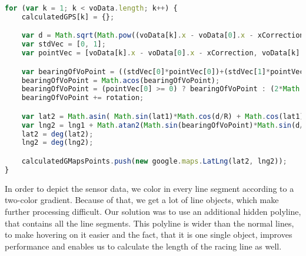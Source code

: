 \begin{lstlisting}[language=JavaScript]
for (var k = 1; k < voData.length; k++) {
	calculatedGPS[k] = {};

	var d = Math.sqrt(Math.pow((voData[k].x - voData[0].x - xCorrection), 2) + Math.pow((voData[k].y - voData[0].y - yCorrection), 2)) * voScaleFactor / 1000;
	var stdVec = [0, 1];
	var pointVec = [voData[k].x - voData[0].x - xCorrection, voData[k].y - voData[0].y - yCorrection];

	var bearingOfVoPoint = ((stdVec[0]*pointVec[0])+(stdVec[1]*pointVec[1]))/(Math.sqrt(Math.pow(stdVec[0], 2)+Math.pow(stdVec[1], 2))*Math.sqrt(Math.pow(pointVec[0], 2)+Math.pow(pointVec[1], 2)));
	bearingOfVoPoint = Math.acos(bearingOfVoPoint);
	bearingOfVoPoint = (pointVec[0] >= 0) ? bearingOfVoPoint : (2*Math.PI)-bearingOfVoPoint;
	bearingOfVoPoint += rotation;

	var lat2 = Math.asin( Math.sin(lat1)*Math.cos(d/R) + Math.cos(lat1)*Math.sin(d/R)*Math.cos(bearingOfVoPoint) );
	var lng2 = lng1 + Math.atan2(Math.sin(bearingOfVoPoint)*Math.sin(d/R)*Math.cos(lat1), Math.cos(d/R)-Math.sin(lat1)*Math.sin(lat2));
	lat2 = deg(lat2);
	lng2 = deg(lng2);

	calculatedGMapsPoints.push(new google.maps.LatLng(lat2, lng2));
}
\end{lstlisting}
\clearpage
In order to depict the sensor data, we color in every line segment according to a two-color gradient. Because of that, we get a lot of line objects, which make further processing difficult. Our solution was to use an additional hidden polyline, that contains all the line segments. This polyline is wider than the normal lines, to make hovering on it easier and the fact, that it is one single object, improves performance and enables us to calculate the length of the racing line as well.

\clearpage